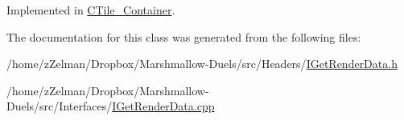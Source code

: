 Implemented in \hyperlink{classCTile__Container_a48c74611efadee522595362a79620bff}{C\-Tile\-\_\-\-Container}.



The documentation for this class was generated from the following files\-:\begin{DoxyCompactItemize}
\item 
/home/z\-Zelman/\-Dropbox/\-Marshmallow-\/\-Duels/src/\-Headers/\hyperlink{IGetRenderData_8h}{I\-Get\-Render\-Data.\-h}\item 
/home/z\-Zelman/\-Dropbox/\-Marshmallow-\/\-Duels/src/\-Interfaces/\hyperlink{IGetRenderData_8cpp}{I\-Get\-Render\-Data.\-cpp}\end{DoxyCompactItemize}
